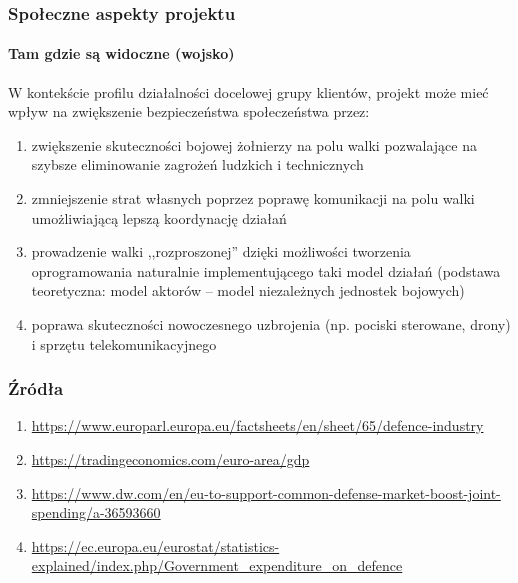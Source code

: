 \documentclass[aspectratio=169]{beamer}
\begin{document}
\begin{frame}
    \frametitle{Społeczne aspekty projektu}
    \framesubtitle{Tam gdzie są widoczne (wojsko)}

    W kontekście profilu działalności docelowej grupy klientów, projekt może
    mieć wpływ na zwiększenie bezpieczeństwa społeczeństwa przez:

    \begin{enumerate}
        \item zwiększenie skuteczności bojowej żołnierzy na polu walki
            pozwalające na szybsze eliminowanie zagrożeń ludzkich i technicznych
        \item zmniejszenie strat własnych poprzez poprawę komunikacji na polu
            walki umożliwiającą lepszą koordynację działań
        \item prowadzenie walki ,,rozproszonej'' dzięki możliwości tworzenia
            oprogramowania naturalnie implementującego taki model działań
            (podstawa teoretyczna: model aktorów -- model niezależnych jednostek
            bojowych)
        \item poprawa skuteczności nowoczesnego uzbrojenia (np. pociski
            sterowane, drony) i sprzętu telekomunikacyjnego
    \end{enumerate}
\end{frame}

\begin{frame}
    \frametitle{Źródła}

    \begin{small}
    \begin{enumerate}
        \item \url{https://www.europarl.europa.eu/factsheets/en/sheet/65/defence-industry}
        \item \url{https://tradingeconomics.com/euro-area/gdp}
        \item \url{https://www.dw.com/en/eu-to-support-common-defense-market-boost-joint-spending/a-36593660}
        \item
            \url{https://ec.europa.eu/eurostat/statistics-explained/index.php/Government_expenditure_on_defence}
    \end{enumerate}
    \end{small}
\end{frame}
\end{document}
